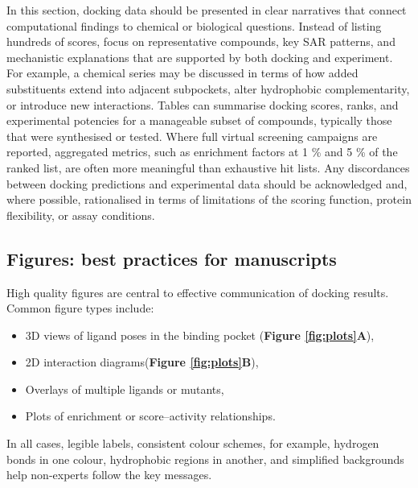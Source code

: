 \documentclass[12pt]{article}
\begin{document}
In this section, docking data should be presented in clear narratives that connect computational findings to chemical or biological questions\cite{CH11_Forli2015,CH11_Cheng2012,CH11_zhu2022}.  Instead of listing hundreds of scores, focus on representative compounds, key SAR patterns, and mechanistic explanations that are supported by both docking and experiment\cite{CH11_Kitchen2004,CH11_Forli2015,CH11_BindingAffinity2018}. For example, a chemical series may be discussed in terms of how added substituents extend into adjacent subpockets, alter hydrophobic complementarity, or introduce new interactions\cite{CH11_Glide2004,CH11_Kitchen2004,CH11_zhu2022}. Tables can summarise docking scores, ranks, and experimental potencies for a manageable subset of compounds, typically those that were synthesised or tested\cite{CH11_Berry2015,CH11_BindingAffinity2018,CH11_EmpiricalScoring2018}. Where full virtual screening campaigns are reported, aggregated metrics, such as enrichment factors at 1 \% and 5 \% of the ranked list, are often more meaningful than exhaustive hit lists\cite{CH11_Forli2015,CH11_Cheng2012,CH11_cosconati2010}.  Any discordances between docking predictions and experimental data should be acknowledged and, where possible, rationalised in terms of limitations of the scoring function, protein flexibility, or assay conditions\cite{CH11_Warren2006,CH11_BindingAffinity2018,CH11_zhu2022}.

\subsection{Figures: best practices for manuscripts}

High quality figures are central to effective communication of docking results\cite{CH11_Berry2015,CH11_Forli2015,CH11_zhu2022}. 
Common figure types include: 
\begin{itemize}
  \item 3D views of ligand poses in the binding pocket (\textbf{Figure \ref{fig:plots}A}), 
  \item 2D interaction diagrams(\textbf{Figure \ref{fig:plots}B}), 
  \item Overlays of multiple ligands or mutants, 
  \item Plots of enrichment or score--activity relationships\cite{CH11_Berry2015,CH11_Forli2015,CH11_EmpiricalScoring2018}. 
\end{itemize}
In all cases, legible labels, consistent colour schemes, for example, hydrogen bonds in one colour, hydrophobic regions in another, and simplified backgrounds help non-experts follow the key messages\cite{CH11_Berry2015,CH11_zhu2022,CH11_cosconati2010}. 
\end{document}
